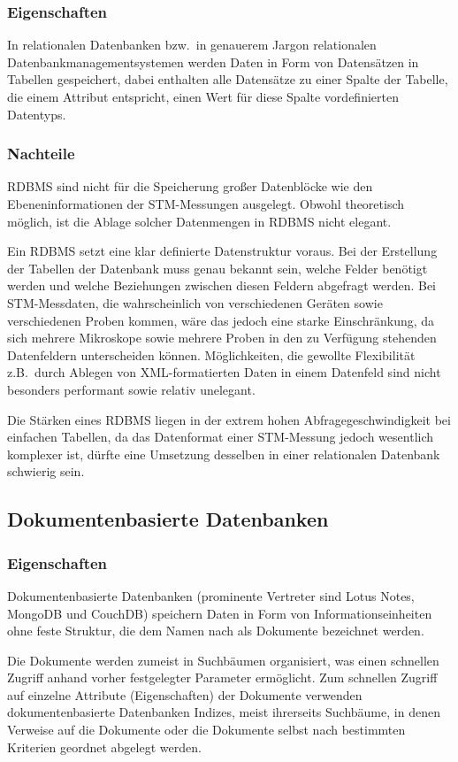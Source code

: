 \documentclass[12pt,ngerman,a4]{scrartcl}
\newcommand{\pquote}[1]{\glqq #1\grqq}
\begin{document}
\subsubsection{Eigenschaften}
In relationalen Datenbanken bzw.\ in genauerem Jargon relationalen Datenbankmanagementsystemen werden Daten in Form von Datensätzen in Tabellen gespeichert, dabei enthalten alle Datensätze zu einer \pquote{Spalte} der Tabelle, die einem Attribut entspricht, einen Wert für diese Spalte vordefinierten Datentyps.
\subsubsection{Nachteile}
RDBMS sind nicht für die Speicherung großer Datenblöcke wie den Ebeneninformationen der STM-Messungen ausgelegt. Obwohl theoretisch möglich, ist die Ablage solcher Datenmengen in RDBMS nicht elegant.

Ein RDBMS setzt eine klar definierte Datenstruktur voraus. Bei der Erstellung der Tabellen der Datenbank muss genau bekannt sein, welche Felder benötigt werden und welche Beziehungen zwischen diesen Feldern abgefragt werden. Bei STM-Messdaten, die wahrscheinlich von verschiedenen Geräten sowie verschiedenen Proben kommen, wäre das jedoch eine starke Einschränkung, da sich mehrere Mikroskope sowie mehrere Proben in den zu Verfügung stehenden Datenfeldern unterscheiden können. Möglichkeiten, die gewollte Flexibilität z.B.\ durch Ablegen von XML-formatierten Daten in einem Datenfeld sind nicht besonders performant sowie relativ unelegant.

Die Stärken eines RDBMS liegen in der extrem hohen Abfragegeschwindigkeit bei einfachen Tabellen, da das Datenformat einer STM-Messung jedoch wesentlich komplexer ist, dürfte eine Umsetzung desselben in einer relationalen Datenbank schwierig sein.
\subsection{Dokumentenbasierte Datenbanken}
\subsubsection{Eigenschaften}
Dokumentenbasierte Datenbanken (prominente Vertreter sind Lotus Notes, MongoDB und CouchDB) speichern Daten in Form von Informationseinheiten ohne feste Struktur, die dem Namen nach als Dokumente bezeichnet werden.

Die Dokumente werden zumeist in Suchbäumen organisiert, was einen schnellen Zugriff anhand vorher festgelegter Parameter ermöglicht. Zum schnellen Zugriff auf einzelne Attribute (Eigenschaften) der Dokumente verwenden dokumentenbasierte Datenbanken Indizes, meist ihrerseits Suchbäume, in denen Verweise auf die Dokumente oder die Dokumente selbst nach bestimmten Kriterien geordnet abgelegt werden.
\end{document}
